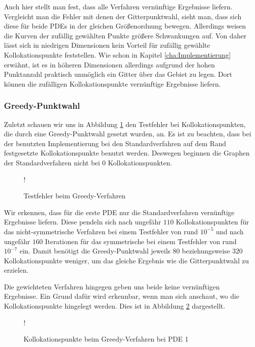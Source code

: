 Auch hier stellt man fest, dass alle Verfahren vernünftige Ergebnisse liefern. Vergleicht man die Fehler mit denen der Gitterpunktwahl, sieht man, dass sich diese für beide \acp{PDE} in der gleichen Größenordnung bewegen. Allerdings weisen die Kurven der zufällig gewählten Punkte größere Schwankungen auf. Von daher lässt sich in niedrigen Dimensionen kein Vorteil für zufällig gewählte Kollokationspunkte feststellen. Wie schon in Kapitel \ref{cha:Implementierung} erwähnt, ist es in höheren Dimensionen allerdings aufgrund der hohen Punktanzahl praktisch unmöglich ein Gitter über das Gebiet zu legen. Dort können die zufälligen Kollokationspunkte vernünftige Ergebnisse liefern.
\pagebreak

\subsubsection{Greedy-Punktwahl}
Zuletzt schauen wir uns in Abbildung \ref{fig:error-greedy} den Testfehler bei Kollokationspunkten, die durch eine Greedy-Punktwahl gesetzt wurden, an. Es ist zu beachten, dass bei der benutzten Implementierung bei den Standardverfahren auf dem Rand festgesetzte Kollokationspunkte benutzt werden. Deswegen beginnen die Graphen der Standardverfahren nicht bei $0$ Kollokationspunkten.
\begin{figure}[ht]
\centering
\resizebox {\columnwidth} {!} {

}
\caption{Testfehler beim Greedy-Verfahren}
\label{fig:error-greedy}
\end{figure}

Wir erkennen, dass für die erste \ac{PDE} nur die Standardverfahren vernünftige Ergebnisse liefern. Diese pendeln sich nach ungefähr $110$ Kollokationspunkten für das nicht-symmetrische Verfahren bei einem Testfehler von rund $10^{-5}$ und nach ungefähr $160$ Iterationen für das symmetrische bei einem Testfehler von rund $10^{-7}$ ein. Damit benötigt die Greedy-Punktwahl jeweils $80$ beziehungsweise $320$ Kollokationspunkte weniger, um das gleiche Ergebnis wie die Gitterpunktwahl zu erzielen.

Die gewichteten Verfahren hingegen geben uns beide keine vernünftigen Ergebnisse. Ein Grund dafür wird erkennbar, wenn man sich anschaut, wo die Kollokationspunkte hingelegt werden. Dies ist in Abbildung \ref{fig:greedy-points} dargestellt.
\begin{figure}[ht]
\centering
\resizebox {\columnwidth} {!} {

}
\caption{Kollokationspunkte beim Greedy-Verfahren bei \acs{PDE} 1}
\label{fig:greedy-points}
\end{figure}

